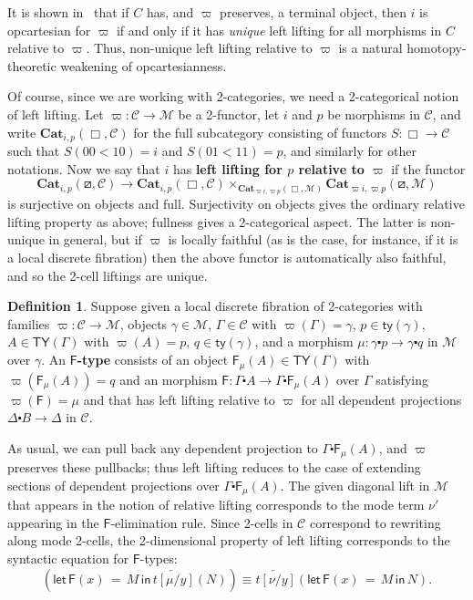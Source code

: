 \documentclass[10pt]{article}
\theoremstyle{definition}
\newtheorem{definition}{Definition}
\newcommand{\rewrite}[2]{\overleftarrow{#1}(#2)}
\newcommand\Fsym{\ensuremath{\mathsf{F}}}
\newcommand\F[2]{\ensuremath{\mathsf{F}_{#1}(#2)}}
\newcommand\FE[3]{\ensuremath{\mathsf{let} \, \mathsf{F}(#2) \, = \, {#1} \, \mathsf{in} \, #3}}
\newcommand\Cat{\mathbf{Cat}}
\newcommand\M{\mathcal{M}}
\newcommand\Mty{\mathsf{ty}}
\newcommand\C{\mathcal{C}}
\newcommand\Cty{\mathsf{TY}}
\newcommand\vp{\varpi}
\newcommand\ce{\mathord{\centerdot}}
\begin{document}
It is shown in~\cite{CagneMellies2019} that if $C$ has, and $\vp$ preserves, a terminal object, then $i$ is opcartesian for $\vp$ if and only if it has \emph{unique} left lifting for all morphisms in $C$ relative to $\vp$.
Thus, non-unique left lifting relative to $\vp$ is a natural homotopy-theoretic weakening of opcartesianness.

Of course, since we are working with 2-categories, we need a 2-categorical notion of left lifting.
Let $\vp:\C\to\M$ be a 2-functor, let $i$ and $p$ be morphisms in $\C$, and write $\Cat_{i,p}(\Box,\C)$ for the full subcategory consisting of functors $S:\Box\to \C$ such that $S(00<10)=i$ and $S(01<11)=p$, and similarly for other notations.
Now we say that $i$ has \textbf{left lifting for $p$ relative to $\vp$} if the functor
\[ \Cat_{i,p}(\boxslash,\C) \to \Cat_{i,p}(\Box,\C) \times_{\Cat_{\vp i,\vp p}(\Box,\M)} \Cat_{\vp i,\vp p}(\boxslash,\M) \]
is surjective on objects and full.
Surjectivity on objects gives the ordinary relative lifting property as above; fullness gives a 2-categorical aspect.
The latter is non-unique in general, but if $\vp$ is locally faithful (as is the case, for instance, if it is a local discrete fibration) then the above functor is automatically also faithful, and so the 2-cell liftings are unique.

\begin{definition}\label{defn:E-sem}
  Suppose given a local discrete fibration of 2-categories with families $\vp:\C\to\M$, objects $\gamma\in\M$, $\Gamma\in \C$ with $\vp(\Gamma)=\gamma$, $p\in \Mty(\gamma)$, $A\in\Cty(\Gamma)$ with $\vp(A)=p$, $q\in \Mty(\gamma)$, and a morphism $\mu : \gamma \ce p \to \gamma\ce q$ in $\M$ over $\gamma$.
  An \textbf{$\Fsym$-type} consists of an object $\F{\mu}{A} \in \Cty(\Gamma)$ with $\vp(\F{\mu}{A}) = q$ and an morphism $\Fsym:\Gamma\ce A \to \Gamma\ce \F\mu A$ over $\Gamma$ satisfying $\vp(\Fsym)=\mu$ and that has left lifting relative to $\vp$ for all dependent projections $\Delta\ce B \to \Delta$ in $\C$.
\end{definition}

As usual, we can pull back any dependent projection to $\Gamma\ce \F\mu A$, and $\vp$ preserves these pullbacks; thus left lifting reduces to the case of extending sections of dependent projections over $\Gamma\ce \F\mu A$.
The given diagonal lift in $\M$ that appears in the notion of relative lifting corresponds to the mode term $\nu'$ appearing in the $\Fsym$-elimination rule.
Since 2-cells in $\C$ correspond to rewriting along mode 2-cells, the 2-dimensional property of left lifting corresponds to the syntactic equation for $\Fsym$-types:
\[ (\FE{M}{x}{\rewrite{t[\mu/y]}{N}}) \equiv \rewrite{t[\nu/y]}{\FE{M}{x}{N}}.\]
\end{document}
